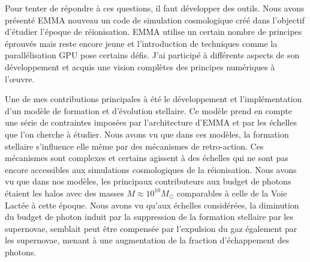 Pour tenter de répondre à ces questions, il faut développer des outils.
Nous avons présenté EMMA nouveau un code de simulation cosmologique créé dans l'objectif d'étudier l'époque de réionisation.
EMMA utilise un certain nombre de principes éprouvés mais reste encore jeune et l'introduction de techniques comme la parallélisation \ac{GPU} pose certains défis.
J'ai participé à différents aspects de son développement et acquis une vision complètes des principes numériques à l’œuvre.

Une de mes contributions principales à été le développement et l'implémentation d'un modèle de formation et d'évolution stellaire.
Ce modèle prend en compte une série de contraintes imposées par l’architecture d'EMMA et par les échelles que l'on cherche à étudier.
Nous avons vu que dans ces modèles, la formation stellaire s'influence elle même par des mécanismes de retro-action.
Ces mécanismes sont complexes et certains agissent à des échelles qui ne sont pas encore accessibles aux simulations cosmologiques de la réionisation.
Nous avons vu que dans nos modèles, les principaux contributeurs aux budget de photons étaient les halos avec des masses $M \approx 10^{10}M_\odot$ comparables à celle de la Voie Lactée à cette époque.
Nous avons vu qu'aux échelles considérées, la diminution du budget de photon induit par la suppression de la formation stellaire par les supernovae, semblait peut être compensée par l'expulsion du gaz également par les supernovae, menant à une augmentation de la fraction d'échappement des photons.

